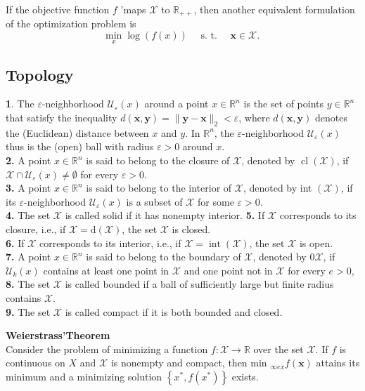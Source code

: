 \documentclass[english]{latex4ei_sheet}
\begin{document}
\begin{sectionbox}

If the objective function $f$ 'maps $\mathcal{X}$ to $\mathbb{R}_{++}$, then another equivalent formulation of the optimization problem is
$$
\min _{x} \log (f(x)) \quad \text { s. t. } \quad \boldsymbol{x} \in \mathcal{X} \text {. }
$$
\end{sectionbox}
\subsection{Topology}
\begin{sectionbox}
\textbf{1}. The $\varepsilon$-neighborhood $\mathcal{U}_{\varepsilon}(x)$ around a point $x \in \mathbb{R}^{n}$ is the set of points $y \in \mathbb{R}^{n}$ that satisfy the inequality $d(\boldsymbol{x}, \boldsymbol{y})=\|\boldsymbol{y}-\boldsymbol{x}\|_{2}<\varepsilon$, where $d(\boldsymbol{x}, \boldsymbol{y})$ denotes the (Euclidean) distance between $x$ and $y$. In $\mathbb{R}^{n}$, the $\varepsilon$-neighborhood $\mathcal{U}_{\varepsilon}(x)$ thus is the (open) ball with radius $\varepsilon>0$ around $x$.\\
\textbf{2.} A point $x \in \mathbb{R}^{n}$ is said to belong to the closure of $\mathcal{X}$, denoted by $\operatorname{cl}(\mathcal{X})$, if $\mathcal{X} \cap \mathcal{U}_{\varepsilon}(x) \neq \emptyset$ for every $\varepsilon>0$.\\
\textbf{3.} A point $x \in \mathbb{R}^{n}$ is said to belong to the interior of $\mathcal{X}$, denoted by int $(\mathcal{X})$, if its $\varepsilon$-neighborhood $\mathcal{U}_{\varepsilon}(x)$ is a subset of $\mathcal{X}$ for some $\varepsilon>0$.\\
\textbf{4.} The set $\mathcal{X}$ is called solid if it has nonempty interior.
\textbf{5.} If $\mathcal{X}$ corresponds to its closure, i.e., if $\mathcal{X}=\mathrm{d}(\mathcal{X})$, the set $\mathcal{X}$ is closed.\\
\textbf{6.} If $\mathcal{X}$ corresponds to its interior, i.e., if $\mathcal{X}=\operatorname{int}(\mathcal{X})$, the set $\mathcal{X}$ is open.\\
\textbf{7.} A point $x \in \mathbb{R}^{n}$ is said to belong to the boundary of $\mathcal{X}$, denoted by $0 \mathcal{X}$, if $\mathcal{U}_{k}(x)$ contains at least one point in $\mathcal{X}$ and one point not in $\mathcal{X}$ for every $e>0$,\\
\textbf{8.} The set $\mathcal{X}$ is called bounded if a ball of sufficiently large but finite radius contains $\mathcal{X}$.\\
\textbf{9.} The set $\mathcal{X}$ is called compact if it is both bounded and closed.
\begin{emphbox}
\textbf{Weierstrass'Theorem}\\
Consider the problem of minimizing a function $f: \mathcal{X} \rightarrow \mathbb{R}$ over the set $\mathcal{X}$. If $f$ is continuous on $X$ and $\mathcal{X}$ is nonempty and compact, then min $_{\infty e x} f(\boldsymbol{x})$ attains its minimum and a minimizing solution $\left\{x^{*}, f\left(x^{*}\right)\right\}$ exists.
\end{emphbox}
\end{sectionbox}
\end{document}
